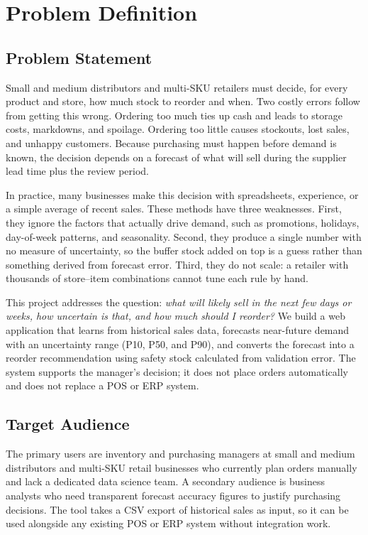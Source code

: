 \section{Problem Definition}

\subsection{Problem Statement}
Small and medium distributors and multi-SKU retailers must decide, for every product and store, how much stock to reorder and when. Two costly errors follow from getting this wrong. Ordering too much ties up cash and leads to storage costs, markdowns, and spoilage. Ordering too little causes stockouts, lost sales, and unhappy customers. Because purchasing must happen before demand is known, the decision depends on a forecast of what will sell during the supplier lead time plus the review period.

In practice, many businesses make this decision with spreadsheets, experience, or a simple average of recent sales. These methods have three weaknesses. First, they ignore the factors that actually drive demand, such as promotions, holidays, day-of-week patterns, and seasonality. Second, they produce a single number with no measure of uncertainty, so the buffer stock added on top is a guess rather than something derived from forecast error. Third, they do not scale: a retailer with thousands of store--item combinations cannot tune each rule by hand.

This project addresses the question: \emph{what will likely sell in the next few days or weeks, how uncertain is that, and how much should I reorder?} We build a web application that learns from historical sales data, forecasts near-future demand with an uncertainty range (P10, P50, and P90), and converts the forecast into a reorder recommendation using safety stock calculated from validation error. The system supports the manager's decision; it does not place orders automatically and does not replace a POS or ERP system.

\subsection{Target Audience}
The primary users are inventory and purchasing managers at small and medium distributors and multi-SKU retail businesses who currently plan orders manually and lack a dedicated data science team. A secondary audience is business analysts who need transparent forecast accuracy figures to justify purchasing decisions. The tool takes a CSV export of historical sales as input, so it can be used alongside any existing POS or ERP system without integration work.

